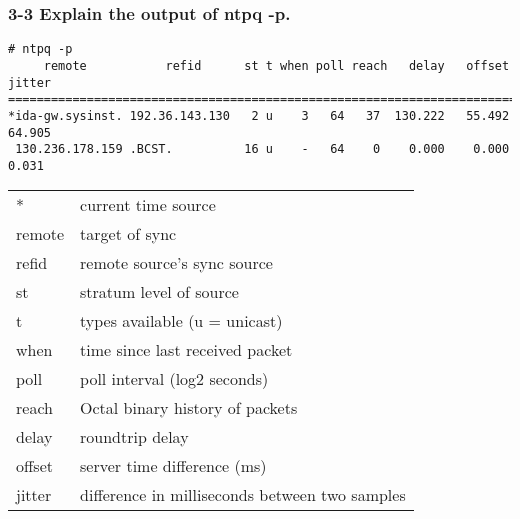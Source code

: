 \subsubsection{3-3 Explain the output of ntpq -p.}
\begin{verbatim}
# ntpq -p
     remote           refid      st t when poll reach   delay   offset  jitter
==============================================================================
*ida-gw.sysinst. 192.36.143.130   2 u    3   64   37  130.222   55.492  64.905
 130.236.178.159 .BCST.          16 u    -   64    0    0.000    0.000   0.031
\end{verbatim}
\vspace{1cm}
\begin{tabular}{l|l}
  * & current time source \\
  remote & target of sync \\
  refid & remote source's sync source \\
  st & stratum level of source\\
  t & types available (u = unicast)\\
  when & time since last received packet\\
  poll & poll interval (log2 seconds)\\
  reach & Octal binary history of packets\\
  delay & roundtrip delay\\
  offset & server time difference (ms)\\
  jitter &difference in milliseconds between two samples
\end{tabular}



